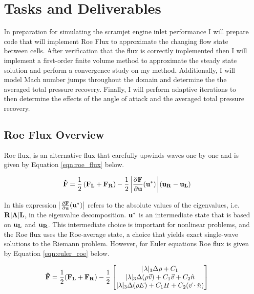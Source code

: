 \pagebreak
\section{Tasks and Deliverables}
In preparation for simulating the scramjet engine inlet performance I will prepare code that will implement Roe Flux to approximate the changing flow state between cells. After verification that the flux is correctly implemented then I will implement a first-order finite volume method to approximate the steady state solution and perform a convergence study on my method. Additionally, I will model Mach number jumps throughout the domain and determine the the averaged total pressure recovery. Finally, I will perform adaptive iterations to then determine the effects of the angle of attack and the averaged total pressure recovery.

\subsection{Roe Flux Overview}

Roe flux, is an alternative flux that carefully upwinds waves one by one and is given by Equation \ref{eqn:roe_flux} below. \cite{notes:kfid}

\vspace{-0.45in}
\begin{equation}\label{eqn:roe_flux}
    {\bf \hat{F}} = \frac{1}{2}\left({\bf F_L + F_R}\right) - \frac{1}{2} \left\lvert \frac{\partial {\bf F}}{\partial {\bf u}}({\bf u}^*)\right\lvert({\bf u_R - u_L})
\end{equation}


In this expression $\left\lvert \frac{\partial {\bf F}}{\partial {\bf u}}({\bf u}^*)\right\lvert$ refers to the absolute values of the eigenvalues, i.e. $\bf R|\Lambda | L$, in the eigenvalue decomposition. $\bf u^*$ is an intermediate state that is based on $\bf u_L$ and $\bf u_R$. This intermediate choice is important for nonlinear problems, and the Roe flux uses the Roe-average state, a choice that yields exact single-wave solutions to the Riemann problem. However, for Euler equations Roe flux is given by Equation \ref{eqn:euler_roe} below.


\begin{equation}\label{eqn:euler_roe}
    {\bf \hat{F}} = \frac{1}{2}({\bf F_L + F_R}) - \frac{1}{2} \begin{bmatrix}
        |\lambda|_3 \Delta \rho + C_1\\
        |\lambda|_3 \Delta (\rho \vec{v}) + C_1\vec{v} + C_2 \hat{n}\\
        |\lambda|_3 \Delta (\rho E) + C_1H + C_2 (\vec{v}\cdot \hat{n})\\
    \end{bmatrix}
\end{equation}


